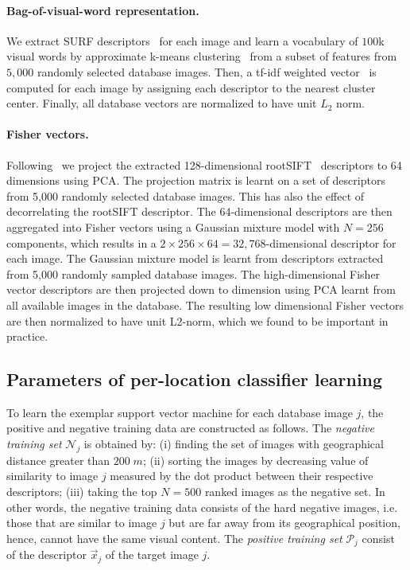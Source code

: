       \paragraph{Bag-of-visual-word representation.}
         We extract SURF descriptors~\cite{Bay06} for each image and learn a vocabulary of $100$k visual words by approximate k-means clustering~\cite{Philbin07} from a subset of features from $5,000$ randomly selected database images. Then, a tf-idf weighted vector~\cite{Sivic03} is computed for each image by assigning each descriptor to the nearest cluster center.  Finally, all database vectors are normalized to have unit $L_2$ norm.
        
      \paragraph{Fisher vectors.}
        Following~\cite{Jegou12} we project the extracted 128-dimensional rootSIFT~\cite{Arandjelovic12} descriptors to 64 dimensions using PCA. The projection matrix is learnt on a set of descriptors from 5,000 randomly selected database images. This has also the effect of decorrelating the rootSIFT descriptor. The 64-dimensional descriptors are then aggregated into Fisher vectors using a Gaussian mixture model with $N=256$ components, which results in a $2\times256\times64 = 32,768$-dimensional descriptor for each image.  
        The Gaussian mixture model is learnt from descriptors extracted from 5,000 randomly sampled database images. The  high-dimensional Fisher vector descriptors are then projected down to dimension using PCA learnt from all available images in the database. The resulting low dimensional Fisher vectors are then normalized to have unit L2-norm, which we found to be important in practice.
      
    \subsection{Parameters of per-location classifier learning}
      To learn the exemplar support vector machine for each database image $j$, the positive and negative training data are constructed as follows. 
      The \emph{negative training set} $\mathcal N_j$ is obtained by: (i) finding the set of images with geographical distance greater than $200\;m$; (ii)  sorting the images by decreasing value of similarity to image $j$ measured by the dot product between their respective descriptors; (iii) taking the top $N=500$ ranked images as the negative set. 
      In other words, the negative training data consists of the hard negative images, i.e. those that are similar to image $j$ but are far away from its geographical position, hence, cannot have the same visual content. 
      The \emph{positive training set} $\mathcal P_j$ consist of the descriptor $\vec{x}_j$ of the target image $j$. 
      
